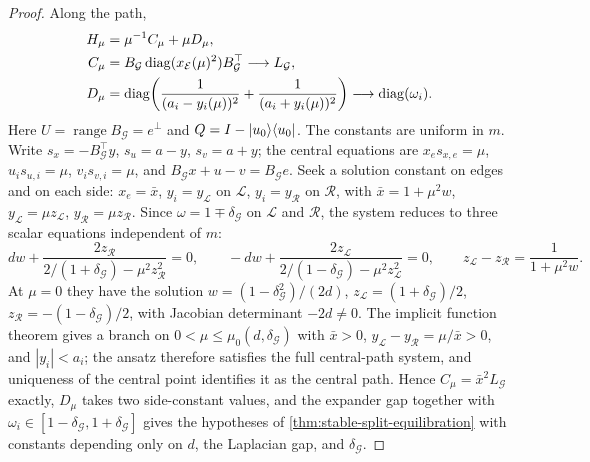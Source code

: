 \begin{proof}
Along the path,
\begin{align}
 H_\mu&=\mu^{-1}C_\mu+\mu D_\mu,\nonumber\\
 C_\mu&=B_{\mathcal G}\operatorname{diag}(x_{\mathcal E}(\mu)^2)
          B_{\mathcal G}^\top\longrightarrow L_{\mathcal G},\nonumber\\
 D_\mu&=\operatorname{diag}\!\left(
 \frac1{(a_i-y_i(\mu))^2}+\frac1{(a_i+y_i(\mu))^2}
 \right)\longrightarrow\operatorname{diag}(\omega_i).
 \label{eq:expander-normal-split}
\end{align}
Here $U=\operatorname{range}B_{\mathcal G}=e^\perp$ and
$Q=I-\lvert u_0\rangle\langle u_0\rvert$.  The constants are uniform in $m$.  Write
$s_x=-B_{\mathcal G}^\top y$, $s_u=a-y$, $s_v=a+y$; the central equations
are $x_es_{x,e}=\mu$, $u_is_{u,i}=\mu$, $v_is_{v,i}=\mu$, and
$B_{\mathcal G}x+u-v=B_{\mathcal G}e$.  Seek a solution constant on edges
and on each side: $x_e=\bar x$, $y_i=y_{\mathcal L}$ on $\mathcal L$,
$y_i=y_{\mathcal R}$ on $\mathcal R$, with $\bar x=1+\mu^2w$,
$y_{\mathcal L}=\mu z_{\mathcal L}$,
$y_{\mathcal R}=\mu z_{\mathcal R}$.  Since
$\omega=1\mp\delta_{\mathcal G}$ on $\mathcal L$ and $\mathcal R$, the
system reduces to three scalar equations independent of $m$:
\[
 dw+\frac{2z_{\mathcal R}}
 {2/(1+\delta_{\mathcal G})-\mu^2z_{\mathcal R}^2}=0,
 \qquad
 -dw+\frac{2z_{\mathcal L}}
 {2/(1-\delta_{\mathcal G})-\mu^2z_{\mathcal L}^2}=0,
 \qquad
 z_{\mathcal L}-z_{\mathcal R}=\frac1{1+\mu^2w}.
\]
At $\mu=0$ they have the solution
$w=(1-\delta_{\mathcal G}^2)/(2d)$,
$z_{\mathcal L}=(1+\delta_{\mathcal G})/2$,
$z_{\mathcal R}=-(1-\delta_{\mathcal G})/2$, with Jacobian determinant
$-2d\neq0$.  The implicit function theorem gives a branch on
$0<\mu\le\mu_0(d,\delta_{\mathcal G})$ with $\bar x>0$,
$y_{\mathcal L}-y_{\mathcal R}=\mu/\bar x>0$, and $|y_i|<a_i$; the ansatz
therefore satisfies the full central-path system, and uniqueness of the
central point identifies it as the central path.  Hence
$C_\mu=\bar x^2L_{\mathcal G}$ exactly, $D_\mu$ takes two side-constant
values, and the expander gap together with
$\omega_i\in[1-\delta_{\mathcal G},1+\delta_{\mathcal G}]$ gives the
hypotheses of \cref{thm:stable-split-equilibration} with constants depending
only on $d$, the Laplacian gap, and $\delta_{\mathcal G}$.


\end{proof}
